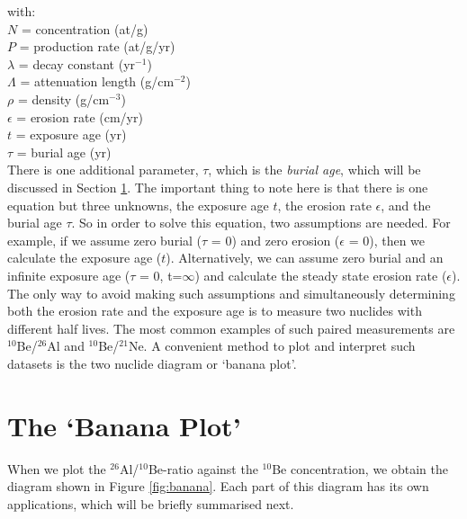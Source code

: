 \documentclass{book}
\begin{document}
with:\\

$N$ = concentration (at/g)\\
\indent $P$ = production rate (at/g/yr)\\
\indent $\lambda$ = decay constant (yr$^{-1}$)\\
\indent $\Lambda$ = attenuation length (g/cm$^{-2}$)\\
\indent $\rho$ = density (g/cm$^{-3}$)\\
\indent $\epsilon$ = erosion rate (cm/yr)\\
\indent $t$ = exposure age (yr)\\
\indent $\tau$ = burial age (yr)\\

There is one additional parameter, $\tau$, which is the \emph{burial
  age}, which will be discussed in Section \ref{sec:banana}. The
important thing to note here is that there is one equation but three
unknowns, the exposure age $t$, the erosion rate $\epsilon$, and the
burial age $\tau$. So in order to solve this equation, two assumptions
are needed. For example, if we assume zero burial ($\tau$ = 0) and
zero erosion ($\epsilon$ = 0), then we calculate the exposure age
($t$). Alternatively, we can assume zero burial and an infinite
exposure age ($\tau$ = 0, t=$\infty$) and calculate the steady state
erosion rate ($\epsilon$). The only way to avoid making such
assumptions and simultaneously determining both the erosion rate and
the exposure age is to measure two nuclides with different half
lives. The most common examples of such paired measurements are
$^{10}$Be/$^{26}$Al and $^{10}$Be/$^{21}$Ne. A convenient method to
plot and interpret such datasets is the two nuclide diagram or `banana
plot'.

\section{The `Banana Plot'}
\label{sec:banana}

When we plot the $^{26}$Al/$^{10}$Be-ratio against the $^{10}$Be
concentration, we obtain the diagram shown in Figure \ref{fig:banana}.
Each part of this diagram has its own applications, which will be
briefly summarised next.\\
\end{document}
